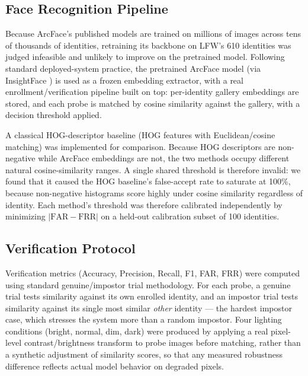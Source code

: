 \documentclass[conference]{IEEEtran}
\begin{document}
\subsection{Face Recognition Pipeline}
\label{sec:facerecpipeline}
Because ArcFace's published models are trained on millions of
images across tens of thousands of identities, retraining its
backbone on LFW's 610 identities was judged infeasible and
unlikely to improve on the pretrained model. Following standard
deployed-system practice, the pretrained ArcFace model (via
InsightFace \cite{insightface}) is used as a frozen embedding
extractor, with a real enrollment/verification pipeline built on
top: per-identity gallery embeddings are stored, and each probe
is matched by cosine similarity against the gallery, with a
decision threshold applied.

A classical HOG-descriptor baseline (HOG features with
Euclidean/cosine matching) was implemented for comparison.
Because HOG descriptors are non-negative while ArcFace embeddings
are not, the two methods occupy different natural
cosine-similarity ranges. A single shared threshold is therefore
invalid: we found that it caused the HOG baseline's false-accept
rate to saturate at 100\%, because non-negative histograms score
highly under cosine similarity regardless of identity. Each
method's threshold was therefore calibrated independently by
minimizing $|\text{FAR}-\text{FRR}|$ on a held-out calibration
subset of 100 identities.

\subsection{Verification Protocol}
\label{sec:verifprotocol}
Verification metrics (Accuracy, Precision, Recall, F1, FAR, FRR)
were computed using standard genuine/impostor trial methodology.
For each probe, a genuine trial tests similarity against its own
enrolled identity, and an impostor trial tests similarity against
its single most similar \textit{other} identity --- the hardest
impostor case, which stresses the system more than a random
impostor. Four lighting conditions (bright, normal, dim, dark)
were produced by applying a real pixel-level contrast/brightness
transform to probe images before matching, rather than a
synthetic adjustment of similarity scores, so that any measured
robustness difference reflects actual model behavior on degraded
pixels.
\end{document}
